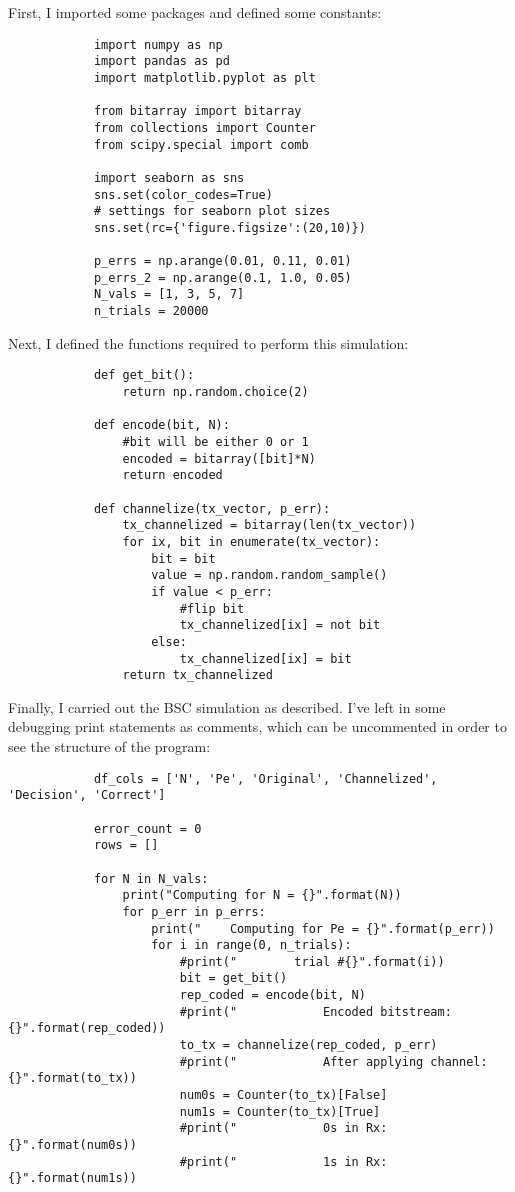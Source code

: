 \documentclass[]{article}
\begin{document}
\begin{enumerate}
\begin{enumerate}
		First, I imported some packages and defined some constants:
		
		\begin{lstlisting}
			import numpy as np
			import pandas as pd
			import matplotlib.pyplot as plt
			
			from bitarray import bitarray
			from collections import Counter
			from scipy.special import comb
			
			import seaborn as sns
			sns.set(color_codes=True)
			# settings for seaborn plot sizes
			sns.set(rc={'figure.figsize':(20,10)})
			
			p_errs = np.arange(0.01, 0.11, 0.01)
			p_errs_2 = np.arange(0.1, 1.0, 0.05)
			N_vals = [1, 3, 5, 7]
			n_trials = 20000
		\end{lstlisting}
	
		Next, I defined the functions required to perform this simulation:
		
		\begin{lstlisting}
			def get_bit():
				return np.random.choice(2)
			
			def encode(bit, N):
				#bit will be either 0 or 1
				encoded = bitarray([bit]*N)
				return encoded
			
			def channelize(tx_vector, p_err):
				tx_channelized = bitarray(len(tx_vector))
				for ix, bit in enumerate(tx_vector):
					bit = bit
					value = np.random.random_sample()
					if value < p_err:
						#flip bit
						tx_channelized[ix] = not bit
					else:
						tx_channelized[ix] = bit
				return tx_channelized
		\end{lstlisting}
	
		Finally, I carried out the BSC simulation as described. I've left in some debugging print statements as comments, which can be uncommented in order to see the structure of the program:
		
		\begin{lstlisting}
			df_cols = ['N', 'Pe', 'Original', 'Channelized', 'Decision', 'Correct']
			
			error_count = 0
			rows = []
			
			for N in N_vals:
				print("Computing for N = {}".format(N))
				for p_err in p_errs:
					print("    Computing for Pe = {}".format(p_err))
					for i in range(0, n_trials):
						#print("        trial #{}".format(i))
						bit = get_bit()
						rep_coded = encode(bit, N)
						#print("            Encoded bitstream: {}".format(rep_coded))
						to_tx = channelize(rep_coded, p_err)
						#print("            After applying channel: {}".format(to_tx))
						num0s = Counter(to_tx)[False]
						num1s = Counter(to_tx)[True]
						#print("            0s in Rx: {}".format(num0s))
						#print("            1s in Rx: {}".format(num1s))
				

\end{lstlisting}
\end{enumerate}
\end{enumerate}
\end{document}
